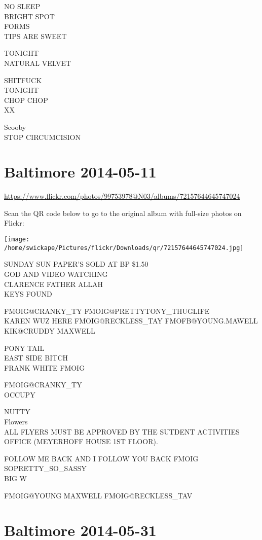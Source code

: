 \documentclass[10pt,letterpaper]{article}
\begin{document}
NO SLEEP\\
BRIGHT SPOT\\
FORMS\\
TIPS ARE SWEET

TONIGHT\\
NATURAL VELVET

SHITFUCK\\
TONIGHT\\
CHOP CHOP\\
XX

Scooby\\
STOP CIRCUMCISION


\section*{Baltimore 2014-05-11}

\url{https://www.flickr.com/photos/99753978@N03/albums/72157644645747024}

Scan the QR code below to go to the original album with full-size photos on Flickr:

\texttt{[image: /home/swickape/Pictures/flickr/Downloads/qr/72157644645747024.jpg]}


SUNDAY SUN PAPER'S SOLD AT BP \$1.50\\
GOD AND VIDEO WATCHING\\
CLARENCE FATHER ALLAH\\
KEYS FOUND

FMOIG@CRANKY\_TY FMOIG@PRETTYTONY\_THUGLIFE\\
KAREN WUZ HERE FMOIG@RECKLESS\_TAY FMOFB@YOUNG.MAWELL KIK@CRUDDY MAXWELL

PONY TAIL\\
EAST SIDE BITCH\\
FRANK WHITE FMOIG

FMOIG@CRANKY\_TY\\
OCCUPY

NUTTY\\
Flowers\\
ALL FLYERS MUST BE APPROVED BY THE SUTDENT ACTIVITIES OFFICE (MEYERHOFF HOUSE 1ST FLOOR).

FOLLOW ME BACK AND I FOLLOW YOU BACK FMOIG SOPRETTY\_SO\_SASSY\\
BIG W

FMOIG@YOUNG MAXWELL FMOIG@RECKLESS\_TAV


\section*{Baltimore 2014-05-31}
\end{document}

